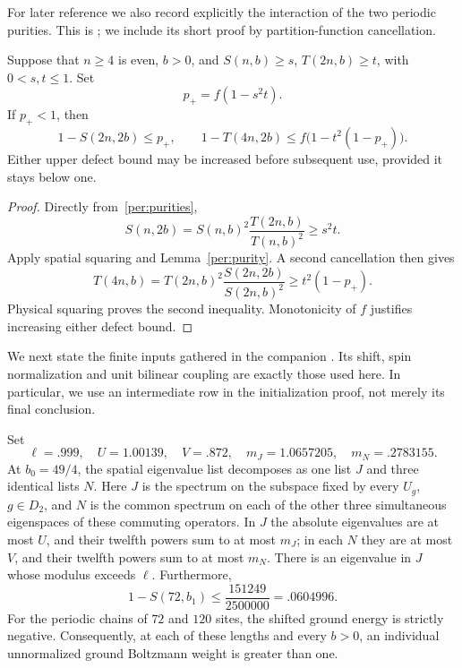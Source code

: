 For later reference we also record explicitly the interaction of the
two periodic purities.  This is \cite[Lemma 4.2]{periodic}; we include its short proof by
partition-function cancellation.

\begin{lemma}\label{per:coupled}
Suppose that $n\ge4$ is even, $b>0$, and
$S(n,b)\ge s$, $T(2n,b)\ge t$, with $0<s,t\le1$.
Set
\[
 p_+=f(1-s^2t).
\]
If $p_+<1$, then
\begin{equation}\label{per:coupled-formula}
 1-S(2n,2b)\le p_+,\qquad
 1-T(4n,2b)\le f\bigl(1-t^2(1-p_+)\bigr).
\end{equation}
Either upper defect bound may be increased before subsequent use,
provided it stays below one.
\end{lemma}

\begin{proof}
Directly from~\eqref{per:purities},
\[
 S(n,2b)=S(n,b)^2\frac{T(2n,b)}{T(n,b)^2}
 \ge s^2t.
\]
Apply spatial squaring and Lemma~\ref{per:purity}.  A second cancellation
then gives
\[
 T(4n,b)=T(2n,b)^2\frac{S(2n,2b)}{S(2n,b)^2}
 \ge t^2(1-p_+).
\]
Physical squaring proves the second inequality.  Monotonicity of $f$
justifies increasing either defect bound.
\end{proof}

We next state the finite inputs gathered in the companion
\cite[Corollary 5.6]{periodic}. Its shift, spin normalization and unit
bilinear coupling are exactly those used here.
In particular, we use an intermediate row in the initialization proof,
not merely its final conclusion.

\begin{proposition}
\label{per:native}
Set
\begin{equation}\label{per:constants}
 \ell=.999,\quad U=1.00139,\quad V=.872,\quad
 m_J=1.0657205,\quad m_N=.2783155.
\end{equation}
At $b_0=49/4$, the spatial eigenvalue list decomposes as one list $J$
and three identical lists $N$. Here $J$ is the spectrum on the subspace
fixed by every $U_g$, $g\in D_2$, and $N$ is the common spectrum on
each of the other three simultaneous eigenspaces of these commuting
operators.
In $J$ the absolute eigenvalues are at
most $U$, and their twelfth powers sum to at most $m_J$; in each $N$
they are at most $V$, and their twelfth powers sum to at most $m_N$.
There is an eigenvalue in $J$ whose modulus exceeds $\ell$.
Furthermore,
\begin{equation}\label{per:native-first-row}
 1-S(72,b_1)\le\frac{151249}{2500000}=.0604996.
\end{equation}
For the periodic chains of $72$ and $120$ sites, the shifted ground
energy is strictly negative.  Consequently, at each of these lengths
and every $b>0$, an individual unnormalized ground Boltzmann weight is
greater than one.
\end{proposition}

